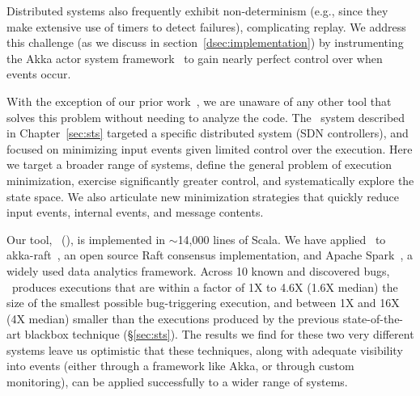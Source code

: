 Distributed systems also frequently exhibit non-determinism (e.g., since they
make extensive use of timers to detect failures), complicating replay. We address this
challenge (as we discuss in
section~\ref{dsec:implementation}) by
instrumenting the Akka actor system framework~\cite{akka} to gain nearly perfect control over when
events occur.

With the exception of our prior work~\cite{sts2014}, we are unaware of any other
tool that solves this problem without needing to analyze the code.
The \projectname~system described in Chapter~\ref{sec:sts} targeted a specific distributed system (SDN controllers), and focused
on minimizing input events given limited control over the execution.
Here we target a broader range of systems, define the
general problem of execution minimization, exercise significantly greater
control, and systematically explore the state space. We also articulate new minimization
strategies that quickly reduce input events,
internal events, and message contents.



Our tool, \system~(\sys), is implemented in {\footnotesize $\sim$}14,000
lines of Scala. We have applied \sys~to akka-raft~\cite{akka-raft}, an open
source Raft consensus implementation, and Apache Spark~\cite{zaharia2012resilient}, a widely used data analytics framework.
Across 10 known and discovered bugs, \sys~produces executions that are within
a factor of 1X to 4.6X (1.6X median) the size of the smallest possible
bug-triggering execution,
and between 1X and 16X (4X median) smaller than the
executions produced by the previous state-of-the-art blackbox technique
(\S\ref{sec:sts}).
The results we find for these two very different systems leave us optimistic that these
techniques, along with adequate visibility into events (either through a
framework like Akka, or through
custom monitoring), can be applied successfully to a wider range of systems.


